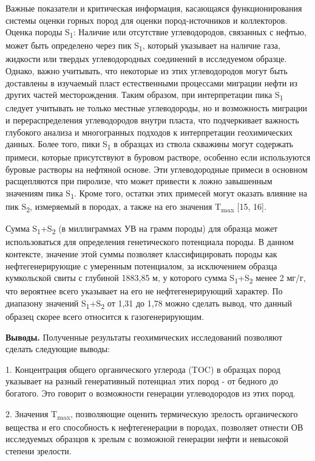 \begin{multicols}{2}
Важные показатели и критическая информация, касающаяся функционирования
системы оценки горных пород для оценки пород-источников и коллекторов.
Оценка породы S\textsubscript{1}: Наличие или отсутствие углеводородов,
связанных с нефтью, может быть определено через пик S\textsubscript{1},
который указывает на наличие газа, жидкости или твердых углеводородных
соединений в исследуемом образце. Однако, важно учитывать, что некоторые
из этих углеводородов могут быть доставлены в изучаемый пласт
естественными процессами миграции нефти из других частей месторождения.
Таким образом, при интерпретации пика S\textsubscript{1} следует
учитывать не только местные углеводороды, но и возможность миграции и
перераспределения углеводородов внутри пласта, что подчеркивает важность
глубокого анализа и многогранных подходов к интерпретации геохимических
данных. Более того, пики S\textsubscript{1} в образцах из ствола
скважины могут содержать примеси, которые присутствуют в буровом
растворе, особенно если используются буровые растворы на нефтяной
основе. Эти углеводородные примеси в основном расщепляются при пиролизе,
что может привести к ложно завышенным значениям пика S\textsubscript{1}.
Кроме того, остатки этих примесей могут оказать влияние на пик
S\textsubscript{2}, измеряемый в породах, а также на его значения
T\textsubscript{max} {[}15, 16{]}.

Сумма S\textsubscript{1}+S\textsubscript{2} (в миллиграммах УВ на грамм
породы) для образца может использоваться для определения генетического
потенциала породы. В данном контексте, значение этой суммы позволяет
классифицировать породы как нефтегенерирующие с умеренным потенциалом,
за исключением образца кумкольской свиты с глубиной 1883,85 м, у
которого сумма S\textsubscript{1}+S\textsubscript{2} менее 2 мг/г, что
вероятнее всего указывает на его не нефтегенерирующий характер. По
диапазону значений S\textsubscript{1}+S\textsubscript{2} от 1,31 до 1,78
можно сделать вывод, что данный образец скорее всего относится к
газогенерирующим.

{\bfseries Выводы.} Полученные результаты геохимических исследований
позволяют сделать следующие выводы:

1. Концентрация общего органического углерода (TOC) в образцах пород
указывает на разный генеративный потенциал этих пород - от бедного до
богатого. Это говорит о возможности генерации углеводородов из этих
пород.

2. Значения T\textsubscript{max}, позволяющие оценить термическую
зрелость органического вещества и его способность к нефтегенерации в
породах, позволяет отнести ОВ исследуемых образцов к зрелым с возможной
генерации нефти и невысокой степени зрелости.


\end{multicols}

